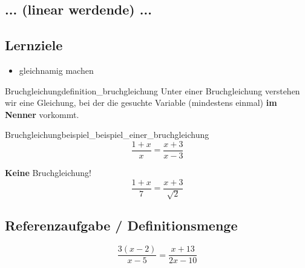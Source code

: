 
\subsection{... (linear werdende) ...}




\subsection*{Lernziele}

\begin{itemize}
	\item gleichnamig machen
\end{itemize}

\begin{definition}{Bruchgleichung}{definition_bruchgleichung}
  Unter einer Bruchgleichung verstehen wir eine Gleichung, bei der die
  gesuchte Variable (mindestens einmal) \textbf{im Nenner} vorkommt.
\end{definition}

\begin{beispiel}{Bruchgleichung}{beispiel_beispiel_einer_bruchgleichung}
$$\frac{1+x}{x}=\frac{x+3}{x-3}$$
\end{beispiel}

\begin{bemerkung}{\textbf{Keine} Bruchgleichung!}{}
  $$\frac{1+x}7=\frac{x+3}{\sqrt{2}}$$
\end{bemerkung}
\newpage

\subsection{Referenzaufgabe / Definitionsmenge}

$$\frac{3(x-2)}{x-5} = \frac{x+13}{2x-10}$$

